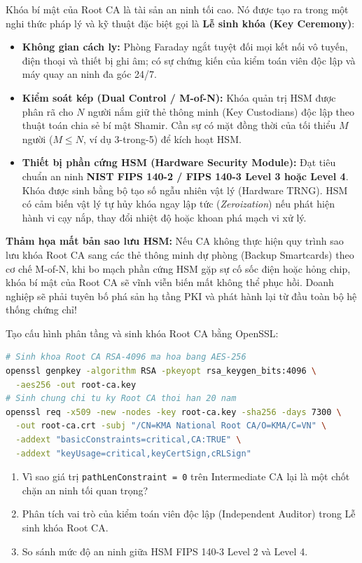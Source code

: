 Khóa bí mật của Root CA là tài sản an ninh tối cao. Nó được tạo ra trong một nghi thức pháp lý và kỹ thuật đặc biệt gọi là \textbf{Lễ sinh khóa (Key Ceremony)}:
\begin{itemize}
  \item \textbf{Không gian cách ly:} Phòng Faraday ngắt tuyệt đối mọi kết nối vô tuyến, điện thoại và thiết bị ghi âm; có sự chứng kiến của kiểm toán viên độc lập và máy quay an ninh đa góc 24/7.
  \item \textbf{Kiểm soát kép (Dual Control / M-of-N):} Khóa quản trị HSM được phân rã cho $N$ người nắm giữ thẻ thông minh (Key Custodians) độc lập theo thuật toán chia sẻ bí mật Shamir. Cần sự có mặt đồng thời của tối thiểu $M$ người ($M \le N$, ví dụ 3-trong-5) để kích hoạt HSM.
  \item \textbf{Thiết bị phần cứng HSM (Hardware Security Module):}
  Đạt tiêu chuẩn an ninh \textbf{NIST FIPS 140-2 / FIPS 140-3 Level 3 hoặc Level 4}. Khóa được sinh bằng bộ tạo số ngẫu nhiên vật lý (Hardware TRNG). HSM có cảm biến vật lý tự hủy khóa ngay lập tức (\emph{Zeroization}) nếu phát hiện hành vi cạy nắp, thay đổi nhiệt độ hoặc khoan phá mạch vi xử lý.
\end{itemize}

\begin{thuthach}
\textbf{Thảm họa mất bản sao lưu HSM:} Nếu CA không thực hiện quy trình sao lưu khóa Root CA sang các thẻ thông minh dự phòng (Backup Smartcards) theo cơ chế M-of-N, khi bo mạch phần cứng HSM gặp sự cố sốc điện hoặc hỏng chip, khóa bí mật của Root CA sẽ vĩnh viễn biến mất không thể phục hồi. Doanh nghiệp sẽ phải tuyên bố phá sản hạ tầng PKI và phát hành lại từ đầu toàn bộ hệ thống chứng chỉ!
\end{thuthach}

\begin{chayngay}
Tạo cấu hình phân tầng và sinh khóa Root CA bằng OpenSSL:
\begin{lstlisting}[language=bash]
# Sinh khoa Root CA RSA-4096 ma hoa bang AES-256
openssl genpkey -algorithm RSA -pkeyopt rsa_keygen_bits:4096 \
  -aes256 -out root-ca.key
# Sinh chung chi tu ky Root CA thoi han 20 nam
openssl req -x509 -new -nodes -key root-ca.key -sha256 -days 7300 \
  -out root-ca.crt -subj "/CN=KMA National Root CA/O=KMA/C=VN" \
  -addext "basicConstraints=critical,CA:TRUE" \
  -addext "keyUsage=critical,keyCertSign,cRLSign"
\end{lstlisting}
\end{chayngay}

\begin{tukiemtra}
\begin{enumerate}
  \item Vì sao giá trị \texttt{pathLenConstraint = 0} trên Intermediate CA lại là một chốt chặn an ninh tối quan trọng?
  \item Phân tích vai trò của kiểm toán viên độc lập (Independent Auditor) trong Lễ sinh khóa Root CA.
  \item So sánh mức độ an ninh giữa HSM FIPS 140-3 Level 2 và Level 4.
\end{enumerate}
\end{tukiemtra}

